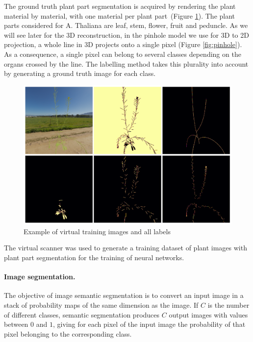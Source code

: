 The ground truth plant part segmentation is acquired by rendering the plant material by material, with one material per
plant part~(Figure \ref{fig:plants}). The
plant parts considered for A. Thaliana are leaf, stem, flower,
fruit and peduncle. As we will see later for the 3D reconstruction, in the pinhole model \cite{sturm_pinhole_2014} we use for 3D to 2D
projection, a whole line in 3D projects onto a single pixel (Figure
\ref{fig:pinhole}). As a consequence, a single pixel can belong to
several classes depending on the organs crossed by the line. The
labelling method takes this plurality into account by generating a
ground truth image for each class.

\begin{figure}[h]
    \centering \includegraphics[width = 0.9\linewidth]{figures/Images_and_labels.png}
    \caption{Example of virtual training images and all labels}
    \label{fig:plants}
\end{figure}

The virtual scanner was used to generate a training dataset of plant
images with plant part segmentation 
for the training of neural networks.


\paragraph{Image segmentation.} The objective of image semantic segmentation is
to convert an input image in a stack of probability maps of the same
dimension as the image. If $C$ is the number of different classes,
semantic segmentation produces $C$ output images with values between $0$ and $1$,
giving for each pixel of the input image the probability of that pixel
belonging to the corresponding class.

